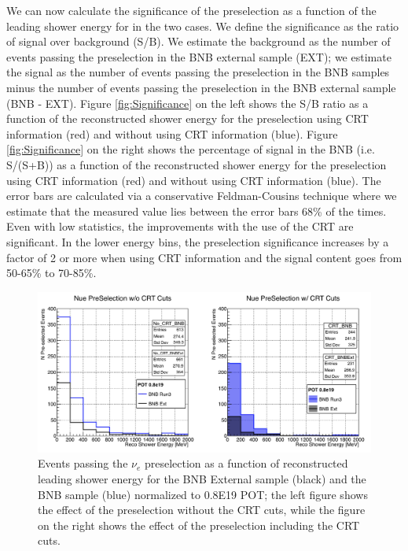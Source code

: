 We can now calculate the significance of the preselection as a function of the leading shower energy for in the two cases.
We define the significance as the ratio of signal over background (S/B). We estimate the background as the number of events passing the preselection in the BNB external sample (EXT); we estimate the signal as the number of events passing the preselection in the BNB samples minus the number of events passing the preselection in the BNB external sample (BNB - EXT). Figure \ref{fig:Significance} on the left shows the S/B ratio as a function of the reconstructed shower energy for the preselection using CRT information (red) and without using CRT information (blue). 
Figure \ref{fig:Significance} on the right shows the percentage of signal in the BNB (i.e. S/(S+B)) as a function of the reconstructed shower energy for the preselection using CRT information (red) and without using CRT information (blue). The error bars are calculated via a conservative Feldman-Cousins technique where we estimate that the measured value lies between the error bars 68\% of the times. Even with low statistics, the improvements with the use of the CRT are significant. In the lower energy bins, the preselection significance increases by a factor of 2 or more when using CRT information and the signal content goes from 50-65\% to 70-85\%.


\begin{figure}[h!]
\centering
\includegraphics[scale=0.4]{images/Compare}
\caption{Events passing the $\nu_e$ preselection as a function of reconstructed leading shower energy for the BNB External sample (black) and the BNB sample (blue) normalized to 0.8E19 POT; the left figure shows the effect of the preselection without the CRT cuts, while the figure on the right shows  the effect of the preselection including the CRT cuts. }
\label{fig:SelVsShowerE}
\end{figure}

